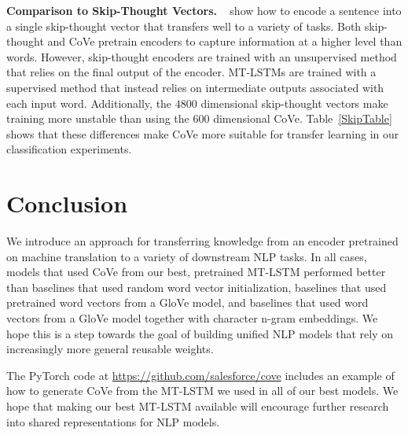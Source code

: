\documentclass{article}
\begin{document}
\textbf{Comparison to Skip-Thought Vectors.}
~\citet{Kiros2015SkipThoughtV} show how to encode a sentence into a single skip-thought vector that transfers well to a variety of tasks.
Both skip-thought and CoVe pretrain encoders to capture information at a higher level than words. However, skip-thought encoders are trained with an unsupervised method that relies on the final output of the encoder. MT-LSTMs are trained with a supervised method that instead relies on intermediate outputs associated with each input word. Additionally, the $4800$ dimensional skip-thought vectors make training more unstable than using the $600$ dimensional CoVe. Table~\ref{SkipTable} shows that these differences make CoVe more suitable for transfer learning in our classification experiments. 
\section{Conclusion}
We introduce an approach for transferring knowledge from an encoder pretrained on machine translation to a variety of downstream NLP tasks. 
In all cases, models that used CoVe from our best, pretrained MT-LSTM performed better than baselines that used random word vector initialization, baselines that used pretrained word vectors from a GloVe model, and baselines that used word vectors from a GloVe model together with character n-gram embeddings.
We hope this is a step towards the goal of building unified NLP models that rely on increasingly more general reusable weights.

The PyTorch code at \url{https://github.com/salesforce/cove} includes an example of how to generate CoVe from the MT-LSTM we used in all of our best models. We hope that making our best MT-LSTM available will encourage further research into shared representations for NLP models.

\small


\end{document}
